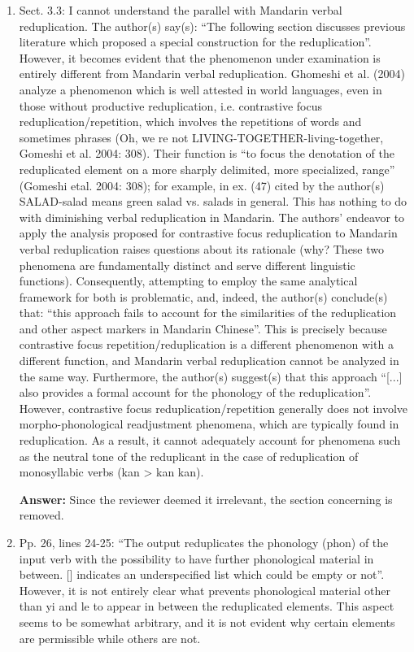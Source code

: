 \documentclass[fleqn,twoside]{article}
\begin{document}
\begin{enumerate}
\item
Sect. 3.3: I cannot understand the parallel with Mandarin verbal reduplication. The
author(s) say(s): “The following section discusses previous literature which proposed a special
construction for the reduplication”. However, it becomes evident that the phenomenon under
examination is entirely different from Mandarin verbal reduplication. Ghomeshi et al. (2004) analyze
a phenomenon which is well attested in world languages, even in those without productive
reduplication, i.e. contrastive focus reduplication/repetition, which involves the repetitions of
words and sometimes phrases (Oh, we re not LIVING-TOGETHER-living-together, Gomeshi et al. 2004: 308). Their function is “to focus the denotation of the reduplicated element on a more sharply delimited, more specialized, range” (Gomeshi etal. 2004: 308); for example, in ex. (47) cited by the author(s) SALAD-salad means green salad vs. salads in general. This has nothing to do with diminishing verbal reduplication in Mandarin. The authors’ endeavor to apply the analysis proposed for contrastive focus reduplication to Mandarin verbal reduplication raises questions about its rationale (why? These two phenomena are fundamentally distinct and serve different linguistic functions). Consequently, attempting to employ the same analytical framework for both is problematic, and, indeed, the author(s) conclude(s) that: “this approach fails to account for the similarities of the reduplication and other aspect markers in Mandarin Chinese”. This is precisely because contrastive focus repetition/reduplication is a different phenomenon with a different function, and Mandarin verbal reduplication cannot be analyzed in the same way. Furthermore, the author(s) suggest(s) that this approach “[...] also provides a formal account for the phonology of the reduplication”. However, contrastive focus reduplication/repetition generally does not involve morpho-phonological readjustment phenomena, which are typically found in reduplication. As a result, it cannot adequately account for phenomena such as the neutral tone of the reduplicant in the case of reduplication of monosyllabic verbs (kan > kan kan).


\textbf{Answer:}
Since the reviewer deemed it irrelevant, the section concerning \citet{Ghomeshietal2004} is removed.

\item Pp. 26, lines 24-25: ``The output reduplicates the phonology (phon) of the input verb with the possibility to have further phonological material in between. [] indicates an underspecified list which could be empty or not''. However, it is not entirely clear what prevents phonological material other than yi and le to appear in between the reduplicated elements. This aspect seems to be somewhat arbitrary, and it is not evident why certain elements are permissible while others are not.


\end{enumerate}
\end{document}
